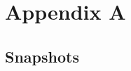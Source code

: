 
\chapter*{Appendix A} 

\label{AppendixA} 

\section*{Snapshots}


\begin{figure}[ht]
    \centering
    \begin{minipage}[b]{0.35\textwidth}
        \centering

\end{minipage}
\end{figure}
